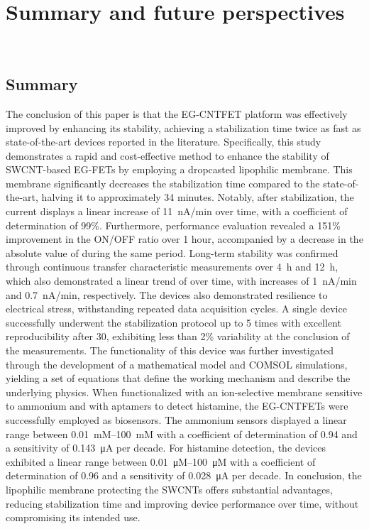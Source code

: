 \chapter*{Summary and future perspectives}
\label{Conclusions}
\thispagestyle{empty}

\newpage
\thispagestyle{empty}
\ %
\newpage

\section*{Summary}

The conclusion of this paper is that the EG-CNTFET platform was effectively improved by enhancing its stability, achieving a stabilization time twice as fast as state-of-the-art devices reported in the literature. Specifically, this study demonstrates a rapid and cost-effective method to enhance the stability of SWCNT-based EG-FETs by employing a dropcasted lipophilic membrane. This membrane significantly decreases the stabilization time compared to the state-of-the-art, halving it to approximately 34 minutes. Notably, after stabilization, the current displays a linear increase of \SI{11}{\nA/min} over time, with a coefficient of determination of 99\%. Furthermore, performance evaluation revealed a 151\% improvement in the ON/OFF ratio over 1 hour, accompanied by a decrease in the absolute value of \vth{} during the same period. Long-term stability was confirmed through continuous transfer characteristic measurements over \SI{4}{\hour} and \SI{12}{\hour}, which also demonstrated a linear trend of \ids{} over time, with increases of \SI{1}{\nA/min} and \SI{0.7}{\nA/min}, respectively. The devices also demonstrated resilience to electrical stress, withstanding repeated data acquisition cycles. A single device successfully underwent the stabilization protocol up to 5 times with excellent reproducibility after \SI{30}{\min}, exhibiting less than 2\% variability at the conclusion of the measurements. The functionality of this device was further investigated through the development of a mathematical model and COMSOL simulations, yielding a set of equations that define the working mechanism and describe the underlying physics. When functionalized with an ion-selective membrane sensitive to ammonium and with aptamers to detect histamine, the EG-CNTFETs were successfully employed as biosensors. The ammonium sensors displayed a linear range between \SIrange{0.01}{100}{mM} with a coefficient of determination of 0.94 and a sensitivity of \SI{0.143}{\uA} per decade. For histamine detection, the devices exhibited a linear range between \SIrange{0.01}{100}{\micro M} with a coefficient of determination of 0.96 and a sensitivity of \SI{0.028}{\uA} per decade. In conclusion, the lipophilic membrane protecting the SWCNTs offers substantial advantages, reducing stabilization time and improving device performance over time, without compromising its intended use.

